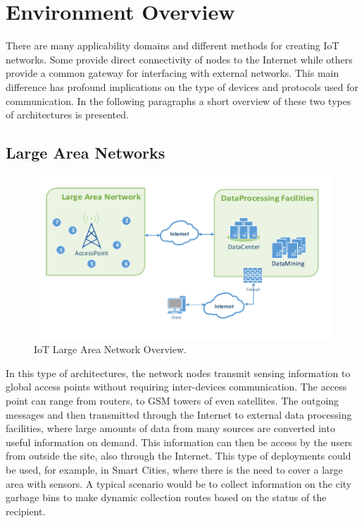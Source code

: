
\chapter{Environment Overview}
\label{sec:network_overview}
There are many applicability domains and different methods for creating \gls{IoT} networks.
Some provide direct connectivity of nodes to the Internet while others provide a common gateway for interfacing with external networks. This main difference has profound implications on the type of devices and protocols used for communication. In the following paragraphs a short overview of these two types of architectures is presented.

\section{Large Area Networks}

\begin{figure}[h]
  \centering
  \includegraphics[width=0.85\linewidth]{figures/Network_Overview_Sparse.pdf}
  \caption{IoT Large Area Network Overview.}
  \label{fig:net_overview_large}
\end{figure}

In this type of architectures, the network nodes transmit sensing information to global access points without requiring inter-devices communication. The access point can range from routers, to GSM towers of even satellites. The outgoing messages and then transmitted through the Internet to external data processing facilities, where large amounts of data from many sources are converted into useful information on demand. This information can then be access by the users from outside the site, also through the Internet.
This type of deployments could be used, for example, in Smart Cities, where there is the need to cover a large area with sensors. A typical scenario would be to collect information on the city garbage bins to make dynamic collection routes based on the status of the recipient.
  
